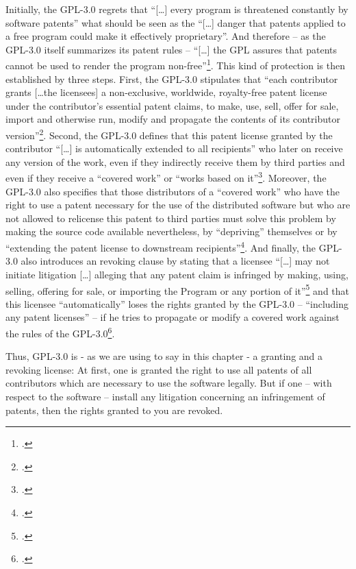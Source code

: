 Initially, the GPL-3.0 regrets that \enquote{[\ldots] every program is
threatened constantly by software patents} what should be seen as the
\enquote{[\ldots] danger that patents applied to a free program could make it
effectively proprietary}. And therefore -- as the GPL-3.0 itself summarizes its
patent rules -- \enquote{[\ldots] the GPL assures that patents cannot be used to
render the program non-free}\footcite[cf.][\nopage wp.\
Preamble]{Gpl30OsiLicense2007a}. This kind of protection is then established by
three steps. First, the GPL-3.0 stipulates that \enquote{each contributor grants
[\ldots the licensees] a non-exclusive, worldwide, royalty-free patent license
under the contributor's essential patent claims, to make, use, sell, offer for
sale, import and otherwise run, modify and propagate the contents of its
contributor version}\footcite[cf.][\nopage wp.\ §11]{Gpl30OsiLicense2007a}.
Second, the GPL-3.0 defines that this patent license granted by the contributor
\enquote{[\ldots] is automatically extended to all recipients} who later on
receive any version of the work, even if they indirectly receive them by third
parties and even if they receive a \enquote{covered work} or \enquote{works
based on it}\footcite[cf.][\nopage wp.\ §11]{Gpl30OsiLicense2007a}. Moreover,
the GPL-3.0 also specifies that those distributors of a \enquote{covered work}
who have the right to use a patent necessary for the use of the distributed
software but who are not allowed to relicense this patent to third parties must
solve this problem by making the source code available nevertheless, by
\enquote{depriving} themselves or by \enquote{extending the patent license to
downstream recipients}\footcite[cf.][\nopage wp.\ §11]{Gpl30OsiLicense2007a}.
And finally, the GPL-3.0 also introduces an revoking clause by stating that a
licensee \enquote{[\ldots] may not initiate litigation [\ldots] alleging that
any patent claim is infringed by making, using, selling, offering for sale, or
importing the Program or any portion of it}\footcite[cf.][\nopage wp.\
§10]{Gpl30OsiLicense2007a} and that this licensee \enquote{automatically} loses
the rights granted by the GPL-3.0 -- \enquote{including any patent licenses} --
if he tries to propagate or modify a covered work against the rules of the
GPL-3.0\footcite[cf.][\nopage wp.\ §8]{Gpl30OsiLicense2007a}.

Thus, GPL-3.0 is - as we are using to say in this chapter - a granting and a
revoking license: At first, one is granted the right to use all patents of all
contributors which are necessary to use the software legally. But if one -- with
respect to the software -- install any litigation concerning an infringement of
patents, then the rights granted to you are revoked.


